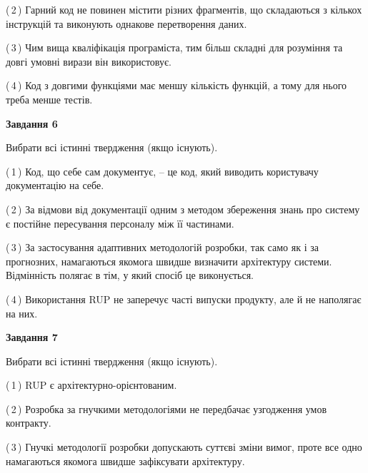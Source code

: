 \documentclass[10pt, ukrainian]{article}
\begin{document}
{\begin {large}
(\,2\,) Гарний код не повинен містити різних фрагментів, що складаються з кількох інструкцій та виконують однакове перетворення даних. %



(\,3\,) Чим вища кваліфікація програміста, тим більш складні для розуміння та довгі умовні вирази він використовує. %



(\,4\,) Код з довгими функціями має меншу кількість функцій, а тому для нього треба менше тестів. %

\newpage

{\begin {center}\textbf{Завдання 6}\end {center}}\par
Вибрати всі істинні твердження (якщо існують).\par
\vspace{2mm}



(\,1\,) Код, що себе сам документує, -- це код, який виводить користувачу документацію на себе. %



(\,2\,) За відмови від документації одним з методом збереження знань про систему є постійне пересування персоналу між її частинами. %



(\,3\,) За застосування адаптивних методологій розробки, так само як і за прогнозних, намагаються якомога швидше визначити архітектуру системи. Відмінність полягає в тім, у який спосіб це виконується.%



(\,4\,) Використання RUP не заперечує часті випуски продукту, але й не наполягає на них. %


{\begin {center}\textbf{Завдання 7}\end {center}}\par
Вибрати всі істинні твердження (якщо існують).\par
\vspace{2mm}



(\,1\,) RUP є архітектурно-орієнтованим. %



(\,2\,) Розробка за гнучкими методологіями не передбачає узгодження умов контракту. %



(\,3\,) Гнучкі методології розробки допускають суттєві зміни вимог, проте все одно намагаються якомога швидше зафіксувати архітектуру. %




\end{large}}
\end{document}
